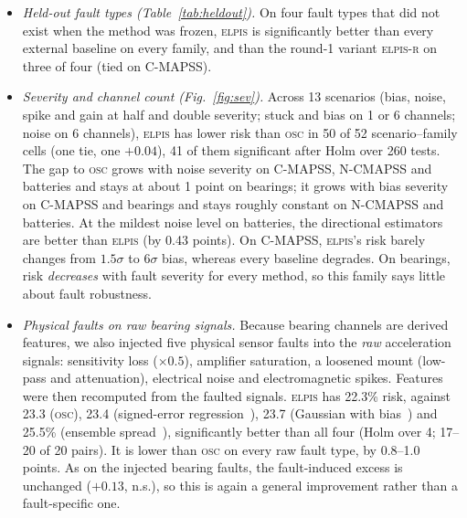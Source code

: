 \documentclass{esannV2}
\newcommand{\OSC}{\textsc{osc}}
\newcommand{\RPT}{\textsc{elpis}}
\newcommand{\Rone}{\textsc{elpis-r}}
\begin{document}
\begin{itemize}
\item \emph{Held-out fault types (Table~\ref{tab:heldout}).} On four fault types that did not exist when the method was frozen, \RPT{} is significantly better than every external baseline on every family, and than the round-1 variant \Rone{} on three of four (tied on C-MAPSS).
\item \emph{Severity and channel count (Fig.~\ref{fig:sev}).} Across 13 scenarios (bias, noise, spike and gain at half and double severity; stuck and bias on 1 or 6 channels; noise on 6 channels), \RPT{} has lower risk than \OSC{} in 50 of 52 scenario--family cells (one tie, one $+0.04$), 41 of them significant after Holm over 260 tests. The gap to \OSC{} grows with noise severity on C-MAPSS, N-CMAPSS and batteries and stays at about 1 point on bearings; it grows with bias severity on C-MAPSS and bearings and stays roughly constant on N-CMAPSS and batteries. At the mildest noise level on batteries, the directional estimators are better than \RPT{} (by 0.43 points). On C-MAPSS, \RPT's risk barely changes from $1.5\sigma$ to $6\sigma$ bias, whereas every baseline degrades. On bearings, risk \emph{decreases} with fault severity for every method, so this family says little about fault robustness.
\item \emph{Physical faults on raw bearing signals.} Because bearing channels are derived features, we also injected five physical sensor faults into the \emph{raw} acceleration signals: sensitivity loss ($\times0.5$), amplifier saturation, a loosened mount (low-pass and attenuation), electrical noise and electromagnetic spikes. Features were then recomputed from the faulted signals. \RPT{} has 22.3\% risk, against 23.3 (\OSC), 23.4 (signed-error regression~\cite{yoo2019learning}), 23.7 (Gaussian with bias~\cite{nix1994estimating}) and 25.5\% (ensemble spread~\cite{lakshminarayanan2017simple}), significantly better than all four (Holm over 4; 17--20 of 20 pairs). It is lower than \OSC{} on every raw fault type, by 0.8--1.0 points. As on the injected bearing faults, the fault-induced excess is unchanged ($+0.13$, n.s.), so this is again a general improvement rather than a fault-specific one.
\end{itemize}
\end{document}
